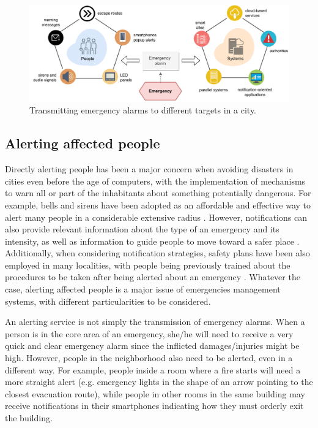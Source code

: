 \begin{refsection}
\begin{figure}[htbp]
  \centering
  \includegraphics[scale=0.75]{Chapters/1-Survey/images/notifications.pdf}
  \caption{Transmitting emergency alarms to different targets in a city.}\label{Fig:notifications}
\end{figure}

\subsection{Alerting affected people}

Directly alerting people has been a major concern when avoiding disasters in cities even before the age of computers, with the implementation of mechanisms to warn all or part of the inhabitants about something potentially dangerous. For example, bells and sirens have been adopted as an affordable and effective way to alert many people in a considerable extensive radius \cite{socialmedia5,citiesemergencies1}. However, notifications can also provide relevant information about the type of an emergency and its intensity, as well as information to guide people to move toward a safer place \cite{emergenciesmetric2}. Additionally, when considering notification strategies, safety plans have been also employed in many localities, with people being previously trained about the procedures to be taken after being alerted about an emergency \cite{quakeculture,citiesdisasters2}. Whatever the case, alerting affected people is a major issue of emergencies management systems, with different particularities to be considered. 

An alerting service is not simply the transmission of emergency alarms. When a person is in the core area of an emergency, she/he will need to receive a very quick and clear emergency alarm since the inflicted damages/injuries might be high. However, people in the neighborhood also need to be alerted, even in a different way. For example, people inside a room where a fire starts will need a more straight alert (e.g. emergency lights in the shape of an arrow pointing to the closest evacuation route), while people in other rooms in the same building may receive notifications in their smartphones indicating how they must orderly exit the building. 


\end{refsection}
